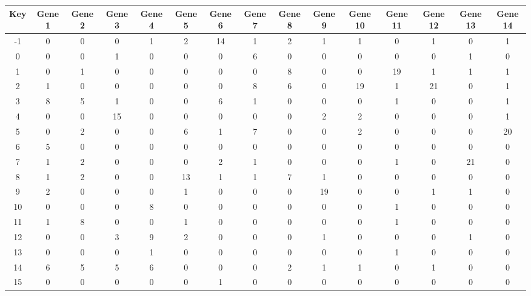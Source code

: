 \begin{tabular}{|c|c|c|c|c|c|c|c|c|c|c|c|c|c|c|}
\hline
Key & Gene 1 & Gene 2 & Gene 3 & Gene 4 & Gene 5 & Gene 6 & Gene 7 & Gene 8 & Gene 9 & Gene 10 & Gene 11 & Gene 12 & Gene 13 & Gene 14 \\
\hline
-1 & 0 & 0 & 0 & 1 & 2 & 14 & 1 & 2 & 1 & 1 & 0 & 1 & 0 & 1 \\
0 & 0 & 0 & 1 & 0 & 0 & 0 & 6 & 0 & 0 & 0 & 0 & 0 & 1 & 0 \\
1 & 0 & 1 & 0 & 0 & 0 & 0 & 0 & 8 & 0 & 0 & 19 & 1 & 1 & 1 \\
2 & 1 & 0 & 0 & 0 & 0 & 0 & 8 & 6 & 0 & 19 & 1 & 21 & 0 & 1 \\
3 & 8 & 5 & 1 & 0 & 0 & 6 & 1 & 0 & 0 & 0 & 1 & 0 & 0 & 1 \\
4 & 0 & 0 & 15 & 0 & 0 & 0 & 0 & 0 & 2 & 2 & 0 & 0 & 0 & 1 \\
5 & 0 & 2 & 0 & 0 & 6 & 1 & 7 & 0 & 0 & 2 & 0 & 0 & 0 & 20 \\
6 & 5 & 0 & 0 & 0 & 0 & 0 & 0 & 0 & 0 & 0 & 0 & 0 & 0 & 0 \\
7 & 1 & 2 & 0 & 0 & 0 & 2 & 1 & 0 & 0 & 0 & 1 & 0 & 21 & 0 \\
8 & 1 & 2 & 0 & 0 & 13 & 1 & 1 & 7 & 1 & 0 & 0 & 0 & 0 & 0 \\
9 & 2 & 0 & 0 & 0 & 1 & 0 & 0 & 0 & 19 & 0 & 0 & 1 & 1 & 0 \\
10 & 0 & 0 & 0 & 8 & 0 & 0 & 0 & 0 & 0 & 0 & 1 & 0 & 0 & 0 \\
11 & 1 & 8 & 0 & 0 & 1 & 0 & 0 & 0 & 0 & 0 & 1 & 0 & 0 & 0 \\
12 & 0 & 0 & 3 & 9 & 2 & 0 & 0 & 0 & 1 & 0 & 0 & 0 & 1 & 0 \\
13 & 0 & 0 & 0 & 1 & 0 & 0 & 0 & 0 & 0 & 0 & 1 & 0 & 0 & 0 \\
14 & 6 & 5 & 5 & 6 & 0 & 0 & 0 & 2 & 1 & 1 & 0 & 1 & 0 & 0 \\
15 & 0 & 0 & 0 & 0 & 0 & 1 & 0 & 0 & 0 & 0 & 0 & 0 & 0 & 0 \\
\hline
\end{tabular}